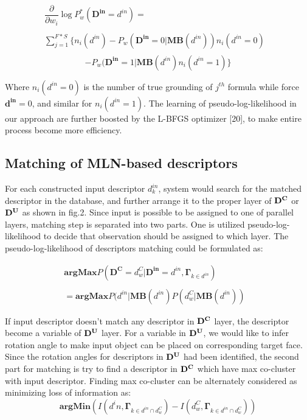 \documentclass[journal]{IEEEtran}
\begin{document}
\begin{displaymath}
\begin{array}{ll}
\dfrac{\partial}{\partial w_i}\log P^*_w(\mathbf{D^{in}} = d^{in})= &\\\\
\sum^{F*S}_{j=1}\{n_i(d^{in})-P_w(\mathbf{D^{in}}=0|\mathbf{MB}(d^{in}))n_i(d^{in}=0) &\\
\end{array}
\end{displaymath}
\begin{equation}
-P_w(\mathbf{D^{in}}=1|\mathbf{MB}(d^{in})n_i(d^{in}=1)\}
\end{equation}

Where $n_i(d^{in}=0)$ is the number of true grounding of $j^{th}$ formula while force $\mathbf{d^{in}}=0$, and similar for $n_i(d^{in}=1)$. The learning of pseudo-log-likelihood in our approach are further boosted by the L-BFGS optimizer [20], to make entire process become more efficiency.

\subsection{Matching of MLN-based descriptors}
For each constructed input descriptor $d^{in}_k$, system would search for the matched descriptor in the database, and further arrange it to the proper layer of $\bf{D^C}$ or $\bf{D^U}$ as shown in fig.2. Since input is possible to be assigned to one of parallel layers, matching step is separated into two parts. One is utilized pseudo-log-likelihood to decide that observation should be assigned to which layer. The pseudo-log-likelihood of descriptors matching could be formulated as:


\begin{equation}
\begin{array}{ll}

\mathbf{argMax}P(\mathbf{D^C} = d^C_w  | \mathbf{D^{in}} = d^{in} , \mathbf{\Gamma}_{k \in {d^{in}}}) &\\\\
= \mathbf{argMax}P(d^{in} | \mathbf{MB}(d^{in}){P(d^{C}_w | \mathbf{MB}(d^{in}))}
\end{array}
\end{equation}


If input descriptor doesn't match any descriptor in $\bf{D^C}$ layer, the descriptor become a variable of  $\bf{D^U}$ layer. For a variable in $\bf{D^U}$, we would like to infer rotation angle to make input object can be placed on corresponding target face. Since the rotation angles for descriptors in $\bf{D^U}$ had been identified, the second part for matching is try to find a descriptor in $\bf{D^C}$ which have max co-cluster with input descriptor. Finding max co-cluster can be alternately considered as minimizing loss of information as:
\begin{equation}
\mathbf{argMin}(I(d^in , \mathbf{\Gamma}_{k \in d^{in} \cap d^C_w}) - I(d^C_w , \mathbf{\Gamma}_{k \in d^{in} \cap d^C_w}))
\end{equation}
\end{document}
